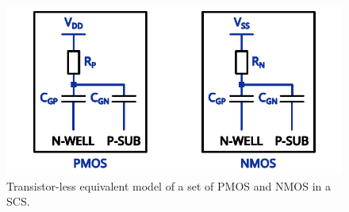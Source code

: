 
\begin{figure}[h]
	\centering
	\includegraphics[width=0.9\columnwidth]{./figures/std_cell_logic_passive.pdf}
	\caption{Transistor-less equivalent model of a set of PMOS and NMOS in a SCS.}
	\label{mos_passive}
\end{figure}
